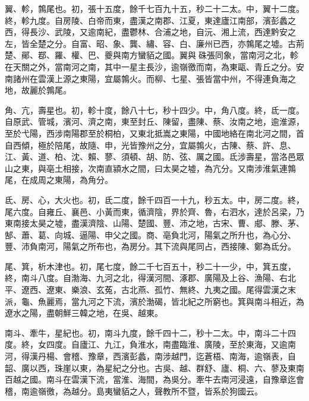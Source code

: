 \begin{pinyinscope}
 翼、軫，鶉尾也。初，張十五度，餘千七百九十五，秒二十二太。中，翼十二度。終，軫九度。自房陵、白帝而東，盡漢之南郡、江夏，東達廬江南部，濱彭蠡之西，得長沙、武陵，又逾南紀，盡鬱林、合浦之地，自沅、湘上流，西達黔安之左，皆全楚之分。自富、昭、象、龔、繡、容、白、廉州已西，亦鶉尾之墟。古荊楚、鄖、鄀、羅、權、巴、夔與南方蠻貊之國。翼與硃張同象，當南河之北，軫在天關之外，當南河之南，其中一星主長沙，逾嶺徼而南，為東甌、青丘之分。安南諸州在雲漢上源之東陽，宜屬鶉火。而柳、七星、張皆當中州，不得連負海之地，故麗於鶉尾。



 角、亢，壽星也。初，軫十度，餘八十七，秒十四少。中，角八度。終，氐一度。自原武、管城，濱河、濟之南，東至封丘、陳留，盡陳、蔡、汝南之地，逾淮源，至於弋陽，西涉南陽郡至於桐柏，又東北抵嵩之東陽，中國地絡在南北河之間，首自西傾，極於陪尾，故隨、申，光皆豫州之分，宜屬鶉火，古陳、蔡、許、息、江、黃、道、柏、沈、賴、蓼、須頓、胡、防、弦、厲之國。氐涉壽星，當洛邑眾山之東，與亳土相接，次南直潁水之間，曰太昊之墟，為亢分。又南涉淮氣連鶉尾，在成周之東陽，為角分。



 氐、房、心，大火也。初，氐二度，餘千四百一十九，秒五太。中，房二度。終，尾六度。自雍丘、襄邑、小黃而東，循濟陰，界於齊、魯，右泗水，達於呂梁，乃東南接太昊之墟，盡漢濟陰、山陽、楚國、豐、沛之地，古宋、曹、郕、滕、茅、郜、蕭、葛、向城、逼陽、申父之國。商、亳負北河，陽氣之所升也，為心分、豐、沛負南河，陽氣之所布也，為房分。其下流與尾同占，西接陳、鄭為氐分。



 尾、箕，析木津也。初，尾七度，餘二千七百五十，秒二十一少，中，箕五度，終，南斗八度。自渤海、九河之北，得漢河間、涿郡、廣陽及上谷、漁陽、右北平、遼西、遼東、樂浪、玄菟，古北燕、孤竹、無終、九夷之國。尾得雲漢之末派，龜、魚麗焉，當九河之下流，濱於渤碣，皆北紀之所窮也。箕與南斗相近，為遼水之陽，盡朝鮮三韓之地，在吳、越東。



 南斗、牽牛，星紀也。初，南斗九度，餘千四十二，秒十二太。中，南斗二十四度。終，女四度。自廬江、九江，負淮水，南盡臨淮、廣陵，至於東海，又逾南河，得漢丹楊、會稽、豫章，西濱彭蠡，南涉越門，迄蒼梧、南海，逾嶺表，自韶、廣以西，珠崖以東，為星紀之分也。古吳、越、群舒、廬、桐、六、蓼及東南百越之國。南斗在雲漢下流，當淮、海間，為吳分。牽牛去南河浸遠，自豫章迄會稽，南逾嶺徼，為越分。島夷蠻貊之人，聲教所不暨，皆系於狗國云。



\end{pinyinscope}